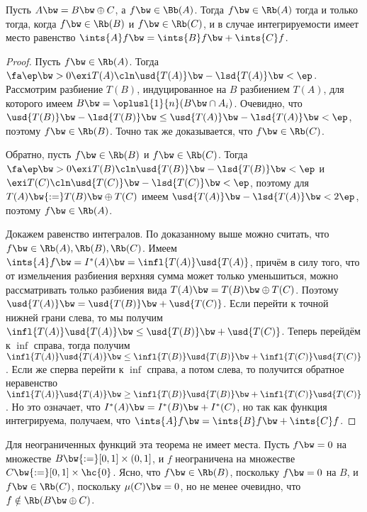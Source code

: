 \documentclass[a4paper]{article}
\begin{document}
\begin{theorem}
Пусть $A\bw=B\bw\oplus C$, а $f \bw\in \Bb(A)$. Тогда $f \bw\in \Rb(A)$ тогда и только тогда, когда $f \bw\in
\Rb(B)$ и $f \bw\in \Rb(C)$, и в случае интегрируемости имеет место равенство $\ints{A} f \bw= \ints{B} f
\bw+ \ints{C} f$.
\end{theorem}
\begin{proof}
Пусть $f \bw\in \Rb(A)$. Тогда $\fa \ep \bw> 0 \exi T(A)\cln \usd{T(A)} \bw- \lsd{T(A)} \bw< \ep$. Рассмотрим
разбиение $T(B)$, индуцированное на $B$ разбиением $T(A)$, для которого имеем $B \bw= \oplusl{1}{n}(B \bw\cap A_i)$.
Очевидно, что $\usd{T(B)}\bw-\lsd{T(B)} \bw\le \usd{T(A)} \bw- \lsd{T(A)} \bw< \ep$,
поэтому $f \bw\in \Rb(B)$. Точно так же доказывается, что $f \bw\in \Rb(C)$.

Обратно, пусть $f \bw\in \Rb(B)$ и $f \bw\in \Rb(C)$. Тогда $\fa \ep \bw> 0 \exi T(B)\cln \usd{T(B)} \bw-
\lsd{T(B)} \bw< \ep$ и $\exi T(C)\cln \usd{T(C)} \bw- \lsd{T(C)} \bw< \ep$, поэтому для $T(A) \bw{:=} T(B)
\bw\oplus T(C)$ имеем $\usd{T(A)} \bw- \lsd{T(A)} \bw< 2\ep$, поэтому $f \bw\in \Rb(A)$.

Докажем равенство интегралов. По доказанному выше можно считать, что $f \bw\in \Rb(A), \Rb(B),
\Rb(C)$. Имеем $\ints{A} f \bw= I^*(A) \bw= \infl{T(A)} \usd{T(A)}$, причём в силу того, что от
измельчения разбиения верхняя сумма может только уменьшиться, можно рассматривать только разбиения
вида $T(A) \bw= T(B) \bw\oplus T(C)$. Поэтому $\usd{T(A)} \bw= \usd{T(B)}\bw+ \usd{T(C)}$. Если перейти к
точной нижней грани слева, то мы получим $\infl{T(A)}\usd{T(A)} \bw\le \usd{T(B)}\bw+ \usd{T(C)}$. Теперь
перейдём к $\inf$ справа, тогда получим $\infl{T(A)}\usd{T(A)} \bw\le \infl{T(B)}\usd{T(B)} \bw+
\infl{T(C)}\usd{T(C)}$. Если же сперва перейти к $\inf$ справа, а потом слева, то получится
обратное неравенство $\infl{T(A)}\usd{T(A)} \bw\ge \infl{T(B)}\usd{T(B)} \bw+ \infl{T(C)}\usd{T(C)}$.
Но это означает, что $I^*(A) \bw= I^*(B) \bw+ I^*(C)$, но так как функция интегрируема, получаем, что
$\ints{A}f \bw= \ints{B} f \bw+ \ints{C} f$.
\end{proof}

\begin{note}
Для неограниченных функций эта теорема не имеет места. Пусть $f \bw= 0$ на множестве $B \bw{:=}
[0,1]\times(0,1]$, и $f$ неограничена на множестве $C \bw{:=} [0,1] \times \hc{0}$. Ясно, что $f
\bw\in \Rb(B)$, поскольку $f \bw= 0$ на $B$, и $f \bw\in \Rb(C)$, поскольку $\mu(C) \bw= 0$, но не менее
очевидно, что $f \notin \Rb(B \bw\oplus C)$.
\end{note}
\end{document}
